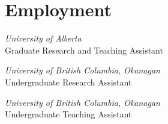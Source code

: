 \documentclass[letterpaper,11pt]{article}
\newlength{\mainindent} \setlength{\mainindent}{12pt}
\newlength{\contentindent} \setlength{\contentindent}{19ex}
\newenvironment{datelist}{
  \begingroup
  \raggedright
  \begin{description}[labelindent=\mainindent,leftmargin=\contentindent,
      style=sameline,font=\normalfont,topsep=0pt,partopsep=0pt,parsep=0pt,
      itemsep=4pt]
}{
  \end{description}
  \endgroup
}
\begin{document}
\section*{Employment}
\begin{datelist}
\item[2014\textendash{}present] \emph{University of Alberta} \\ Graduate Research and Teaching Assistant
\item[2013-2014] \emph{University of British Columbia, Okanagan} \\ Undergraduate Research Assistant
\item[2011-2014] \emph{University of British Columbia, Okanagan} \\ Undergraduate Teaching Assistant
\end{datelist}

\end{document}
